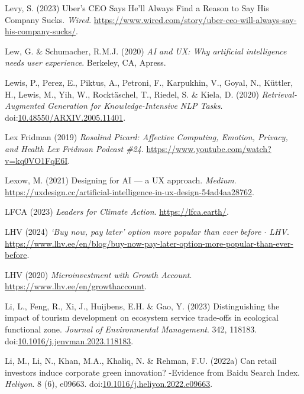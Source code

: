 \documentclass[
  letterpaper,
  DIV=11,
  numbers=noendperiod]{scrartcl}
\newlength{\cslhangindent}
\newenvironment{CSLReferences}[2] %
 {\begin{list}{}{%
  \setlength{\itemindent}{0pt}
  \setlength{\leftmargin}{0pt}
  \setlength{\parsep}{0pt}
  \ifodd #1
   \setlength{\leftmargin}{\cslhangindent}
   \setlength{\itemindent}{-1\cslhangindent}
  \fi
  \setlength{\itemsep}{#2\baselineskip}}}
 {\end{list}}
\begin{document}
\begin{CSLReferences}{0}{1}
Levy, S. (2023) Uber's {CEO Says He}'ll {Always Find} a {Reason} to {Say
His Company Sucks}. \emph{Wired}.
\url{https://www.wired.com/story/uber-ceo-will-always-say-his-company-sucks/}.

Lew, G. \& Schumacher, R.M.J. (2020) \emph{{AI} and {UX}: Why artificial
intelligence needs user experience}. Berkeley, CA, Apress.

Lewis, P., Perez, E., Piktus, A., Petroni, F., Karpukhin, V., Goyal, N.,
Küttler, H., Lewis, M., Yih, W., Rocktäschel, T., Riedel, S. \& Kiela,
D. (2020) \emph{Retrieval-{Augmented Generation} for
{Knowledge-Intensive NLP Tasks}}.
doi:\href{https://doi.org/10.48550/ARXIV.2005.11401}{10.48550/ARXIV.2005.11401}.

Lex Fridman (2019) \emph{Rosalind {Picard}: {Affective Computing},
{Emotion}, {Privacy}, and {Health} {\textbar} {Lex Fridman Podcast}
\#24}. \url{https://www.youtube.com/watch?v=kq0VO1FqE6I}.

Lexow, M. (2021) Designing for {AI} --- a {UX} approach. \emph{Medium}.
\url{https://uxdesign.cc/artificial-intelligence-in-ux-design-54ad4aa28762}.

LFCA (2023) \emph{Leaders for {Climate Action}}.
\url{https://lfca.earth/}.

LHV (2024) \emph{{`{Buy} now, pay later'} option more popular than ever
before {\(\cdot\)} {LHV}}.
\url{https://www.lhv.ee/en/blog/buy-now-pay-later-option-more-popular-than-ever-before}.

LHV (2020) \emph{Microinvestment with {Growth Account}}.
\url{https://www.lhv.ee/en/growthaccount}.

Li, L., Feng, R., Xi, J., Huijbens, E.H. \& Gao, Y. (2023)
Distinguishing the impact of tourism development on ecosystem service
trade-offs in ecological functional zone. \emph{Journal of Environmental
Management}. 342, 118183.
doi:\href{https://doi.org/10.1016/j.jenvman.2023.118183}{10.1016/j.jenvman.2023.118183}.

Li, M., Li, N., Khan, M.A., Khaliq, N. \& Rehman, F.U. (2022a) Can
retail investors induce corporate green innovation? -{Evidence} from
{Baidu Search Index}. \emph{Heliyon}. 8 (6), e09663.
doi:\href{https://doi.org/10.1016/j.heliyon.2022.e09663}{10.1016/j.heliyon.2022.e09663}.


\end{CSLReferences}
\end{document}
